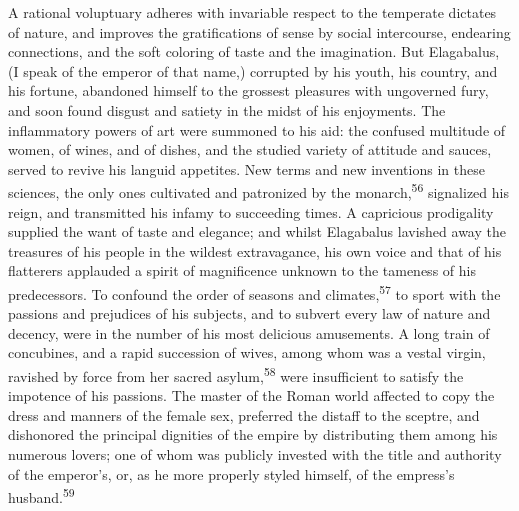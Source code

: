 A rational voluptuary adheres with invariable respect to the
temperate dictates of nature, and improves the gratifications of
sense by social intercourse, endearing connections, and the soft
coloring of taste and the imagination. But Elagabalus, (I speak
of the emperor of that name,) corrupted by his youth, his
country, and his fortune, abandoned himself to the grossest
pleasures with ungoverned fury, and soon found disgust and
satiety in the midst of his enjoyments. The inflammatory powers
of art were summoned to his aid: the confused multitude of women,
of wines, and of dishes, and the studied variety of attitude and
sauces, served to revive his languid appetites. New terms and new
inventions in these sciences, the only ones cultivated and
patronized by the monarch,\textsuperscript{56} signalized his reign, and
transmitted his infamy to succeeding times. A capricious
prodigality supplied the want of taste and elegance; and whilst
Elagabalus lavished away the treasures of his people in the
wildest extravagance, his own voice and that of his flatterers
applauded a spirit of magnificence unknown to the tameness of his
predecessors. To confound the order of seasons and climates,\textsuperscript{57}
to sport with the passions and prejudices of his subjects, and to
subvert every law of nature and decency, were in the number of
his most delicious amusements. A long train of concubines, and a
rapid succession of wives, among whom was a vestal virgin,
ravished by force from her sacred asylum,\textsuperscript{58} were insufficient to
satisfy the impotence of his passions. The master of the Roman
world affected to copy the dress and manners of the female sex,
preferred the distaff to the sceptre, and dishonored the
principal dignities of the empire by distributing them among his
numerous lovers; one of whom was publicly invested with the title
and authority of the emperor’s, or, as he more properly styled
himself, of the empress’s husband.\textsuperscript{59}




